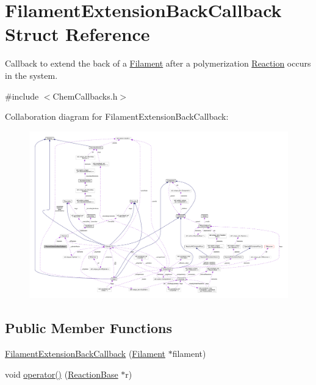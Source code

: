 \hypertarget{structFilamentExtensionBackCallback}{\section{Filament\+Extension\+Back\+Callback Struct Reference}
\label{structFilamentExtensionBackCallback}
}


Callback to extend the back of a \hyperlink{classFilament}{Filament} after a polymerization \hyperlink{classReaction}{Reaction} occurs in the system.  




{\ttfamily \#include $<$Chem\+Callbacks.\+h$>$}



Collaboration diagram for Filament\+Extension\+Back\+Callback\+:
\nopagebreak
\begin{figure}[H]
\begin{center}
\leavevmode
\includegraphics[width=350pt]{structFilamentExtensionBackCallback__coll__graph}
\end{center}
\end{figure}
\subsection*{Public Member Functions}
\begin{DoxyCompactItemize}
\item 
\hyperlink{structFilamentExtensionBackCallback_ae25bee5ab1d5a49404cc0bb0bbe6ffc4}{Filament\+Extension\+Back\+Callback} (\hyperlink{classFilament}{Filament} $\ast$filament)
\item 
void \hyperlink{structFilamentExtensionBackCallback_aa88d35776e587996b2a7936b6314f380}{operator()} (\hyperlink{classReactionBase}{Reaction\+Base} $\ast$r)
\end{DoxyCompactItemize}
